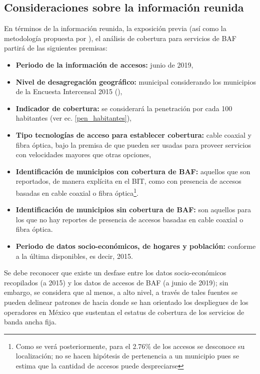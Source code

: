 \documentclass[9pt,twocolumn,twoside]{ilcss}
\begin{document}
\subsection{Consideraciones sobre la información reunida}

En términos de la información reunida, la exposición previa (así como la metodología propuesta por \cite{IFTcobertura2018}), el análisis de cobertura para servicios de BAF partirá de las siguientes premisas:

\begin{itemize}
	\item \textbf{Periodo de la información de accesos:} junio de 2019,\vspace{-0.2cm}
	\item \textbf{Nivel de desagregación geográfico:} municipal considerando los municipios de la Encuesta Intercensal 2015 (\cite{Intercensal2015}),\vspace{-0.2cm}
	\item \textbf{Indicador de cobertura:} se considerará la penetración por cada 100 habitantes (ver ec. \ref{pen_habitantes}),\vspace{-0.2cm} 
	\item \textbf{Tipo tecnologías de acceso para establecer cobertura:} cable coaxial y fibra óptica, bajo la premisa de que
	pueden ser usadas para proveer servicios con velocidades mayores que otras opciones,\vspace{-0.2cm}
	\item \textbf{Identificación de municipios con cobertura de BAF:} aquellos que son reportados, de manera explícita en el BIT, como con presencia de accesos basadas en cable coaxial o fibra óptica\footnote{Como se verá posteriormente, para el 2.76\% de los accesos se desconoce su localización; no se hacen hipótesis de pertenencia a un municipio pues se estima que la cantidad de accesos puede despreciarse}.\vspace{-0.2cm}
	\item \textbf{Identificación de municipios sin cobertura de BAF:} son aquellos para los que no hay reportes de presencia de accesos basadas en cable coaxial o fibra óptica.\vspace{-0.2cm}
	\item \textbf{Periodo de datos socio-económicos, de hogares y población:} conforme a la última disponibles, es decir, 2015.\vspace{-0.1cm}
\end{itemize}

Se debe reconocer que existe un desfase entre los datos socio-económicos recopilados (a 2015) y los datos de accesos de BAF (a junio de 2019); sin embargo, se considera que al menos, a alto nivel, a través de tales fuentes se pueden delinear patrones de hacia donde se han orientado los despliegues de los operadores en México que sustentan el estatus de cobertura de los servicios de banda ancha fija. 
\end{document}
